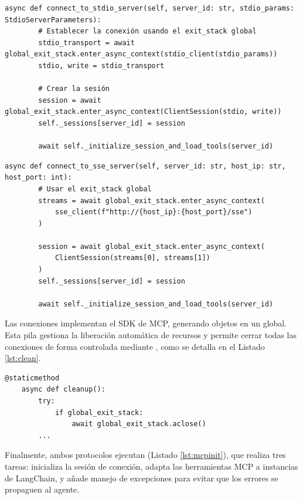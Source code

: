 \begin{lstlisting}[caption={\protect\opus{mcp_multi_client.py}: función \protect\opus{connect_to_stdio_server} en el cliente MCP},label={lst:mcpstdio}]
    async def connect_to_stdio_server(self, server_id: str, stdio_params: StdioServerParameters):
        # Establecer la conexión usando el exit_stack global
        stdio_transport = await global_exit_stack.enter_async_context(stdio_client(stdio_params))
        stdio, write = stdio_transport

        # Crear la sesión
        session = await global_exit_stack.enter_async_context(ClientSession(stdio, write))
        self._sessions[server_id] = session

        await self._initialize_session_and_load_tools(server_id)
\end{lstlisting}

\begin{lstlisting}[caption={\protect\opus{mcp_multi_client.py}: función \protect\opus{connect_to_sse_server} en el cliente MCP},label={lst:mcpsse}]
    async def connect_to_sse_server(self, server_id: str, host_ip: str, host_port: int):
        # Usar el exit_stack global
        streams = await global_exit_stack.enter_async_context(
            sse_client(f"http://{host_ip}:{host_port}/sse")
        )

        session = await global_exit_stack.enter_async_context(
            ClientSession(streams[0], streams[1])
        )
        self._sessions[server_id] = session

        await self._initialize_session_and_load_tools(server_id)
\end{lstlisting}

Las conexiones implementan el SDK de MCP, generando objetos  en un  global. Esta pila gestiona la liberación automática de recursos y permite cerrar todas las conexiones de forma controlada mediante , como se detalla en el Listado \ref{lst:clean}.

\begin{lstlisting}[caption={\protect\opus{mcp_multi_client.py}: función \protect\opus{cleanup()} en el cliente MCP},label={lst:clean}]
    @staticmethod
    async def cleanup():
        try:
            if global_exit_stack:
                await global_exit_stack.aclose()
        ...

\end{lstlisting}

Finalmente, ambos protocolos ejecutan  (Listado \ref{lst:mcpinit}), que realiza tres tareas: inicializa la sesión de conexión, adapta las herramientas MCP a instancias  de LangChain, y añade manejo de excepciones para evitar que los errores se propaguen al agente.

